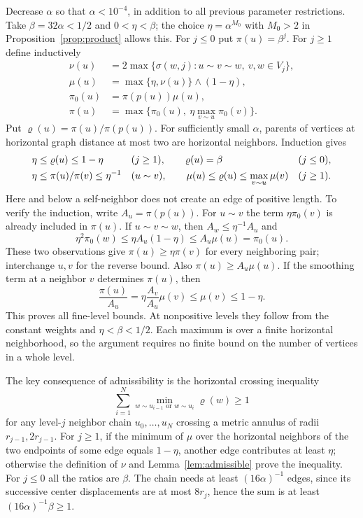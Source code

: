 \documentclass[11pt,reqno]{amsart}
\theoremstyle{plain}
\theoremstyle{definition}
\theoremstyle{remark}
\newcommand{\1}{\mathbf{1}}
\begin{document}
Decrease $\alpha$ so that $\alpha<10^{-4}$, in addition to all previous parameter restrictions. Take $\beta=32\alpha<1/2$ and $0<\eta<\beta$; the choice $\eta=\alpha^{M_0}$ with $M_0>2$ in Proposition~\ref{prop:product} allows this. For $j\le0$ put $\pi(u)=\beta^j$. For $j\ge1$ define inductively
\begin{equation}\label{eq:weights-filling}
\begin{split}
\nu(u)&=2\max\{\sigma(w,j):u\sim v\sim w,\ v,w\in V_j\},\\
\mu(u)&=\max\{\eta,\nu(u)\}\wedge(1-\eta),\\
\pi_0(u)&=\pi(p(u))\mu(u),\\
\pi(u)&=\max\{\pi_0(u),\ \eta\max_{v\sim u}\pi_0(v)\}.
\end{split}
\end{equation}
Put $\varrho(u)=\pi(u)/\pi(p(u))$. For sufficiently small $\alpha$, parents of vertices at horizontal graph distance at most two are horizontal neighbors. Induction gives
\begin{align}\label{eq:weight-bounds}
&\eta\le\varrho(u)\le1-\eta &&(j\ge1),\qquad
\varrho(u)=\beta &&(j\le0),\notag\\
&\eta\le\pi(u)/\pi(v)\le\eta^{-1} &&(u\sim v),\qquad
\mu(u)\le\varrho(u)\le\max_{v\sim u}\mu(v) &&(j\ge1).
\end{align}
Here and below a self-neighbor does not create an edge of positive length. To verify the induction, write $A_u=\pi(p(u))$. For $u\sim v$ the term $\eta\pi_0(v)$ is already included in $\pi(u)$. If $u\sim v\sim w$, then $A_w\le\eta^{-1}A_u$ and
\begin{equation*}
\eta^2\pi_0(w)\le\eta A_u(1-\eta)\le A_u\mu(u)=\pi_0(u).
\end{equation*}
These two observations give $\pi(u)\ge\eta\pi(v)$ for every neighboring pair; interchange $u,v$ for the reverse bound. Also $\pi(u)\ge A_u\mu(u)$. If the smoothing term at a neighbor $v$ determines $\pi(u)$, then
\begin{equation*}
\frac{\pi(u)}{A_u}=\eta\frac{A_v}{A_u}\mu(v)\le\mu(v)\le1-\eta.
\end{equation*}
This proves all fine-level bounds. At nonpositive levels they follow from the constant weights and $\eta<\beta<1/2$. Each maximum is over a finite horizontal neighborhood, so the argument requires no finite bound on the number of vertices in a whole level.

The key consequence of admissibility is the horizontal crossing inequality
\begin{equation}\label{eq:horizontal}
\sum_{i=1}^N\min_{w\sim u_{i-1}\text{ or }w\sim u_i}\varrho(w)\ge1
\end{equation}
for any level-$j$ neighbor chain $u_0,\ldots,u_N$ crossing a metric annulus of radii $r_{j-1},2r_{j-1}$. For $j\ge1$, if the minimum of $\mu$ over the horizontal neighbors of the two endpoints of some edge equals $1-\eta$, another edge contributes at least $\eta$; otherwise the definition of $\nu$ and Lemma~\ref{lem:admissible} prove the inequality. For $j\le0$ all the ratios are $\beta$. The chain needs at least $(16\alpha)^{-1}$ edges, since its successive center displacements are at most $8r_j$, hence the sum is at least $(16\alpha)^{-1}\beta\ge1$.
\end{document}
